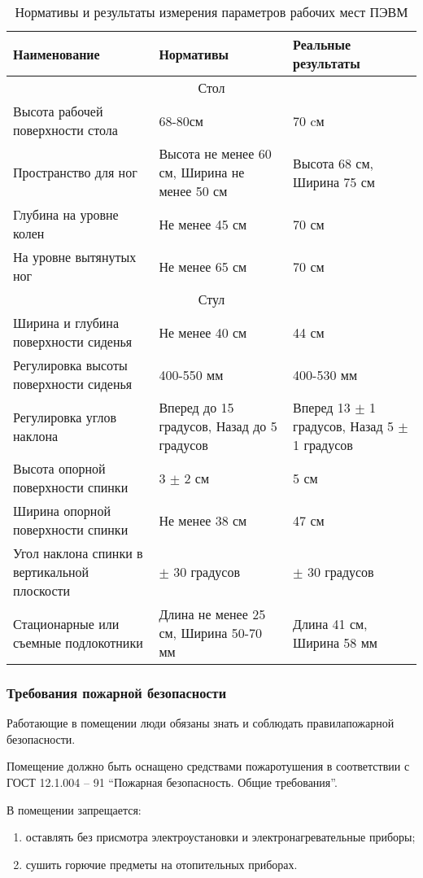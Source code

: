\begin{longtable}[h!]{|*3{m{}|}}
\caption{Нормативы и результаты измерения параметров рабочих мест ПЭВМ}
\label{tab:bzd}
\hline
Наименование & Нормативы & Реальные результаты \\ \hline
\multicolumn{3}{|c|}{Стол} \\ \hline
Высота рабочей поверхности стола & 68-80см & 70 cм \\ \hline
Пространство для ног & Высота не менее 60 см, Ширина не менее 50 см & Высота 68 см, Ширина 75 см \\ \hline
Глубина на уровне колен & Не менее 45 см & 70 см \\ \hline
На уровне вытянутых ног & Не менее 65 см & 70 см \\ \hline
\multicolumn{3}{|c|}{Стул} \\ \hline
Ширина и глубина поверхности сиденья & Не менее 40 см & 44 см \\ \hline
Регулировка высоты поверхности сиденья & 400-550 мм & 400-530 мм \\ \hline
Регулировка углов наклона & Вперед до 15 градусов,  Назад до 5 градусов & Вперед 13 $\pm$ 1 градусов, Назад 5 $\pm$ 1 градусов \\ \hline
Высота опорной поверхности спинки & 3 $\pm$ 2 см & 5 см \\ \hline
Ширина опорной поверхности спинки & Не менее 38 см & 47 см \\ \hline
Угол наклона спинки в вертикальной плоскости & $\pm$ 30 градусов & $\pm$ 30 градусов \\ \hline
Стационарные или съемные подлокотники & Длина не менее 25 см, Ширина 50-70 мм & Длина 41 см, Ширина 58 мм \\ \hline
\end{longtable}

\subsubsection{Требования пожарной безопасности}
Работающие в помещении люди обязаны знать и соблюдать правилапожарной безопасности.

Помещение должно быть оснащено средствами пожаротушения в соответствии с ГОСТ 12.1.004 – 91 ``Пожарная безопасность. Общие требования''.

В помещении запрещается:
\begin{enumerate}
\item оставлять без присмотра электроустановки и электронагревательные приборы;
\item сушить горючие предметы на отопительных приборах.
\end{enumerate}

